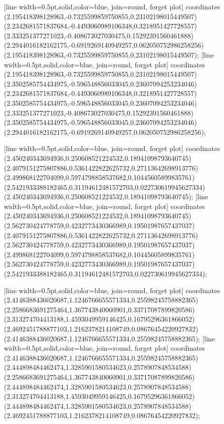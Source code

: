 [line width=0.5pt,solid,color=blue, join=round, forget plot] coordinates {(2.195418398128963,-0.7325599859750855,0.23102198015449507) (2.2342681571837684,-0.4493060989106348,0.3218951427728557) (2.333251377271023,-0.408673027030475,0.15292391560461888) (2.2944016182162175,-0.6919269140949257,0.062050752986258256) (2.195418398128963,-0.7325599859750855,0.23102198015449507)};
[line width=0.5pt,solid,color=blue, join=round, forget plot] coordinates {(2.195418398128963,-0.7325599859750855,0.23102198015449507) (2.3502585754434975,-0.596548856033045,0.23607094253234046) (2.2342681571837684,-0.4493060989106348,0.3218951427728557) (2.3502585754434975,-0.596548856033045,0.23607094253234046) (2.333251377271023,-0.408673027030475,0.15292391560461888) (2.3502585754434975,-0.596548856033045,0.23607094253234046) (2.2944016182162175,-0.6919269140949257,0.062050752986258256)};

[line width=0.5pt,solid,color=blue, join=round, forget plot] coordinates {(2.450240343694936,0.250608521224532,0.18941098793640745) (2.4079151275807886,0.5361422822625732,0.27113642698913776) (2.499868122704099,0.5974798858537682,0.10445605899835761) (2.5421933388182465,0.31194612481572703,0.022730619945627334) (2.450240343694936,0.250608521224532,0.18941098793640745)};
[line width=0.5pt,solid,color=blue, join=round, forget plot] coordinates {(2.450240343694936,0.250608521224532,0.18941098793640745) (2.562730424778759,0.4232773430366989,0.19501987657437037) (2.4079151275807886,0.5361422822625732,0.27113642698913776) (2.562730424778759,0.4232773430366989,0.19501987657437037) (2.499868122704099,0.5974798858537682,0.10445605899835761) (2.562730424778759,0.4232773430366989,0.19501987657437037) (2.5421933388182465,0.31194612481572703,0.022730619945627334)};

[line width=0.5pt,solid,color=blue, join=round, forget plot] coordinates {(2.4146388436020687,1.1246766655571334,0.25598245758882365) (2.2586683691275464,1.367743840060901,0.33717087899820586) (2.313274704413188,1.4593049959146425,0.16795296361866052) (2.4692451788877103,1.2162378214108749,0.08676454220927832) (2.4146388436020687,1.1246766655571334,0.25598245758882365)};
[line width=0.5pt,solid,color=blue, join=round, forget plot] coordinates {(2.4146388436020687,1.1246766655571334,0.25598245758882365) (2.444898484462474,1.3285901580534623,0.2578907848534588) (2.2586683691275464,1.367743840060901,0.33717087899820586) (2.444898484462474,1.3285901580534623,0.2578907848534588) (2.313274704413188,1.4593049959146425,0.16795296361866052) (2.444898484462474,1.3285901580534623,0.2578907848534588) (2.4692451788877103,1.2162378214108749,0.08676454220927832)};

